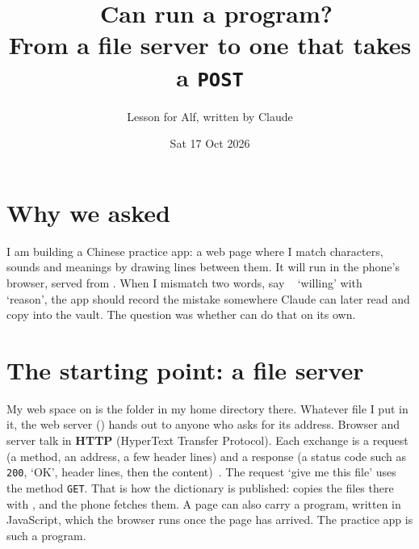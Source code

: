 \documentclass[11pt,a4paper]{article}
\title{\emo{globe with meridians}\ Can \name{cims} run a program?\\[0.3em]
  \large From a file server to one that takes a \texttt{POST}}
\author{Lesson for Alf, written by Claude}
\date{Sat 17 Oct 2026}
\newcommand{\yuanyi}{\toneD{願}\toneD{意}}
\newcommand{\yuanyin}{\toneB{原}\toneA{因}}
\begin{document}
\maketitle

\section*{Why we asked}

I am building a Chinese practice app: a web page where I match characters, sounds and meanings by drawing lines between them. It will run in the phone's browser, served from . When I mismatch two words, say \yuanyi\ \textit{} ‘willing’ with \yuanyin\ \textit{} ‘reason’, the app should record the mistake somewhere Claude can later read and copy into the vault. The question was whether  can do that on its own.

\section{The starting point: a file server}

My web space on  is the folder  in my home directory there. Whatever file I put in it, the web server () hands out to anyone who asks for its address. Browser and server talk in \textbf{HTTP} (HyperText Transfer Protocol). Each exchange is a request (a method, an address, a few header lines) and a response (a status code such as \texttt{200}, ‘OK’, header lines, then the content)~\cite[\textit{HTTP: Accessing Websites}, p.~994]{lutz}. The request ‘give me this file’ uses the method \texttt{GET}. That is how the dictionary is published:  copies the files there with , and the phone fetches them. A page can also carry a program, written in JavaScript, which the browser runs once the page has arrived. The practice app is such a program.

\begin{center}
\end{center}
\end{document}
